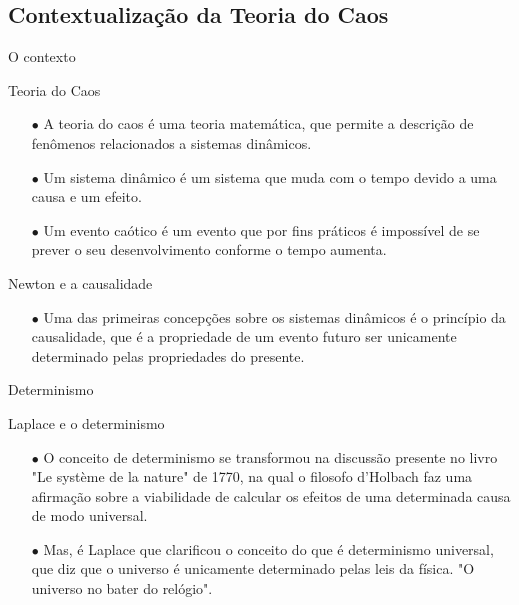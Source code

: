 \documentclass{beamer}
\begin{document}
\subsection{Contextualização da Teoria do Caos}
\begin{frame}{O contexto}
    \begin{exampleblock}{Teoria do Caos}
        \begin{itemize}
		\item [$\bullet$] A teoria do caos é uma teoria matemática, que permite a descrição de fenômenos relacionados a sistemas dinâmicos.
		\item [$\bullet$] Um sistema dinâmico é um sistema que muda com o tempo devido a uma causa e um efeito.
		\item [$\bullet$] Um evento caótico é um evento que por fins práticos é impossível de se prever o seu desenvolvimento conforme o tempo aumenta.
        \end{itemize}
    \end{exampleblock}
    \begin{exampleblock}{Newton e a causalidade}
    	\begin{itemize}
    		\item [$\bullet$] Uma das primeiras concepções sobre os sistemas dinâmicos é o princípio da causalidade, que é a propriedade de um evento futuro ser  unicamente determinado pelas propriedades do presente.
    	\end{itemize}
    \end{exampleblock}
\end{frame}

\begin{frame}{Determinismo}
			
	\begin{exampleblock}{Laplace e o determinismo}
		\begin{itemize}
			\item [$\bullet$] O conceito de determinismo se transformou na discussão presente no livro "Le système de la nature" de 1770, na qual o filosofo d'Holbach faz uma afirmação sobre a viabilidade de calcular os efeitos de uma determinada causa de modo universal.
			
			\item [$\bullet$] Mas, é Laplace que clarificou o conceito do que é determinismo universal, que diz que o universo é unicamente determinado pelas leis da física. "O universo no bater do relógio".
	
		\end{itemize}
	\end{exampleblock}
\end{frame}
\end{document}
